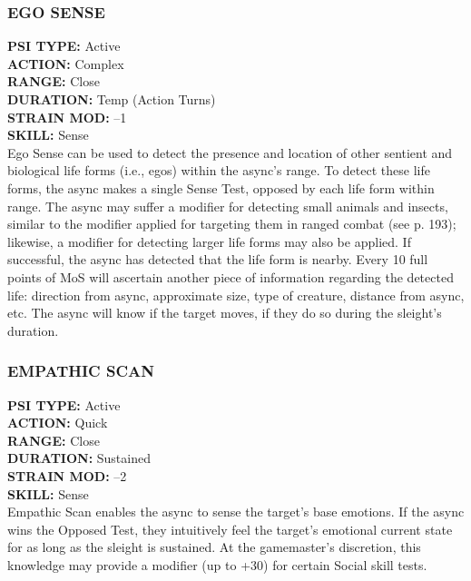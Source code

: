 \subsubsection{EGO SENSE} \textbf{PSI TYPE:} Active \\ \textbf{ACTION:} Complex \\ \textbf{RANGE:} Close \\ \textbf{DURATION:} Temp (Action Turns) \\ \textbf{STRAIN MOD:} –1 \\ \textbf{SKILL:} Sense\\ Ego Sense can be used to detect the presence and location of other sentient and biological life forms (i.e., egos) within the async’s range. To detect these life forms, the async makes a single Sense Test, opposed by each life form within range. The async may suffer a modifier for detecting small animals and insects, similar to the modifier applied for targeting them in ranged combat (see p. 193); likewise, a modifier for detecting larger life forms may also be applied. If successful, the async has detected that the life form is nearby. Every 10 full points of MoS will ascertain another piece of information regarding the detected life: direction from async, approximate size, type of creature, distance from async, etc. The async will know if the target moves, if they do so during the sleight’s duration. 

\subsubsection{EMPATHIC SCAN} \textbf{PSI TYPE:} Active \\ \textbf{ACTION:} Quick \\ \textbf{RANGE:} Close \\ \textbf{DURATION:} Sustained \\ \textbf{STRAIN MOD:} –2 \\ \textbf{SKILL:} Sense\\ Empathic Scan enables the async to sense the target’s base emotions. If the async wins the Opposed Test, they intuitively feel the target’s emotional current state for as long as the sleight is sustained. At the gamemaster’s discretion, this knowledge may provide a modifier (up to +30) for certain Social skill tests. 


